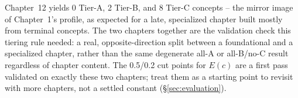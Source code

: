 Chapter~12 yields 0 Tier-A, 2 Tier-B, and 8 Tier-C concepts -- the mirror
image of Chapter~1's profile, as expected for a late, specialized chapter
built mostly from terminal concepts. The two chapters together are the
validation check this tiering rule needed: a real, opposite-direction split
between a foundational and a specialized chapter, rather than the same
degenerate all-A or all-B/no-C result regardless of chapter content. The
0.5/0.2 cut points for $E(c)$ are a first pass validated on exactly these two
chapters; treat them as a starting point to revisit with more chapters, not a
settled constant (\S\ref{sec:evaluation}).
